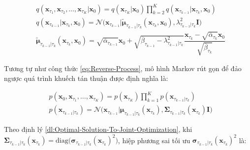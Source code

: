 \documentclass[14pt, a4paper]{article}
\numberwithin{equation}{section}
\numberwithin{figure}{section}
\numberwithin{dl}{section}
\numberwithin{md}{section}
\numberwithin{bd}{section}
\numberwithin{dn}{section}
\numberwithin{hq}{section}
\begin{document}
    \begin{equation*}
        \begin{aligned}
            & q(\boldsymbol{x}_{\tau_1}, \boldsymbol{x}_{\tau_2}, \dots, \boldsymbol{x}_{\tau_K} \vert \boldsymbol{x}_0) = q(\boldsymbol{x}_{\tau_K} \vert \boldsymbol{x}_0) \prod_{k=2}^K q(\boldsymbol{x}_{\tau_{k-1}} \vert \boldsymbol{x}_{\tau_k}, \boldsymbol{x}_0) \\
            & q(\boldsymbol{x}_{\tau_{k-1}} \vert \boldsymbol{x}_{\tau_k}, \boldsymbol{x}_0) = \mathcal{N} \big( \boldsymbol{x}_{\tau_{k-1}} \vert \tilde{\boldsymbol{\mu}}_{\tau_{k-1} \vert \tau_k} (\boldsymbol{x}_{\tau_k}, \boldsymbol{x}_0), \lambda_{\tau_{k-1} \vert \tau_k}^2 \boldsymbol{I} \big) \\
            & \tilde{\boldsymbol{\mu}}_{\tau_{k-1} \vert \tau_k} (\boldsymbol{x}_{\tau_k}, \boldsymbol{x}_0) = \sqrt{\overline{\alpha}_{\tau_{k-1}}} \boldsymbol{x}_0 + \sqrt{\overline{\beta}_{\tau_{k-1}} - \lambda_{\tau_{k-1} \vert \tau_k}^2} \dfrac{\boldsymbol{x}_{\tau_k} - \sqrt{\overline{\alpha}_{\tau_k}}\boldsymbol{x}_0}{\sqrt{\overline{\beta}_{\tau_k}}}
        \end{aligned}
    \end{equation*}

    Tương tự như công thức \ref{eq:Reverse-Process}, mô hình Markov rút gọn để đảo ngược quá trình khuếch tán thuận được định nghĩa là:

    \begin{equation*}
        \begin{aligned}
            & p(\boldsymbol{x}_0, \boldsymbol{x}_{\tau_1}, \dots, \boldsymbol{x}_{\tau_K}) = p(\boldsymbol{x}_{\tau_K}) \prod_{k=1}^K p(\boldsymbol{x}_{\tau_{k-1} \vert \tau_k}) \\
            & p(\boldsymbol{x}_{\tau_{k-1} \vert \tau_k}) = \mathcal{N} \big( \boldsymbol{x}_{\tau_{k-1}} \vert \boldsymbol{\mu}_{\tau_{k-1} \vert \tau_k} (\boldsymbol{x}_{\tau_k}), \boldsymbol{\Sigma}_{\tau_{k-1} \vert \tau_k} (\boldsymbol{x}_{\tau_k}) \boldsymbol{I} \big)
        \end{aligned}
    \end{equation*}

    Theo định lý \ref{dl:Optimal-Solution-To-Joint-Optimization}, khi $\boldsymbol{\Sigma}_{\tau_{k-1} \vert \tau_k} (\boldsymbol{x}_{\tau_k})=\mathrm{diag} \big( \boldsymbol{\sigma}_{\tau_{k-1} \vert \tau_k} (\boldsymbol{x}_{\tau_k})^2 \big)$, hiệp phương sai tối ưu $\boldsymbol{\sigma}_{\tau_{k-1} \vert \tau_k} (\boldsymbol{x}_{\tau_k})^2$ là:
\end{document}
